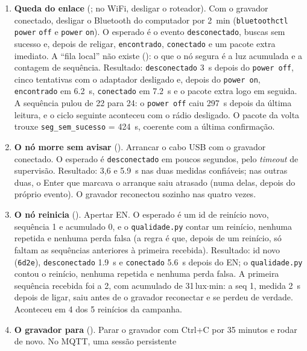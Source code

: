 \begin{enumerate}[label=\alph*)]
  \item \textbf{Queda do enlace} (; no WiFi, desligar o roteador).
    Com o gravador conectado, desligar o Bluetooth do computador por
    \SI{2}{\minute} (\texttt{bluetoothctl} \texttt{power} \texttt{off} e \texttt{power} \texttt{on}).
    O esperado é o evento \texttt{desconectado}, buscas sem sucesso e,
    depois de religar, \texttt{encontrado}, \texttt{conectado} e um pacote
    extra imediato. A \enquote{fila local} não existe (): o que o nó
    segura é a luz acumulada e a contagem de sequência. Resultado:
    \texttt{desconectado} \SI{3}{\second} depois do \texttt{power off},
    cinco tentativas com o adaptador desligado e, depois do
    \texttt{power on}, \texttt{encontrado} em \SI{6.2}{\second},
    \texttt{conectado} em \SI{7.2}{\second} e o pacote extra logo em
    seguida. A sequência pulou de 22 para 24: o \texttt{power off} caiu
    \SI{297}{\second} depois da última leitura, e o ciclo seguinte
    aconteceu com o rádio desligado. O pacote da volta trouxe
    \texttt{seg\_sem\_sucesso} = \SI{424}{\second}, coerente com a última
    confirmação.
  \item \textbf{O nó morre sem avisar} (). Arrancar o cabo USB com o
    gravador conectado. O esperado é \texttt{desconectado} em poucos
    segundos, pelo \emph{timeout} de supervisão. Resultado:
    3,6 e \SI{5.9}{\second} nas duas medidas confiáveis; nas outras duas,
    o Enter que marcava o arranque saiu atrasado (numa delas, depois do
    próprio evento). O gravador reconectou sozinho nas quatro vezes.
  \item \textbf{O nó reinicia} (). Apertar EN. O esperado é um id de
    reinício novo, sequência 1 e acumulado 0, e o \texttt{qualidade.py}
    contar um reinício, nenhuma repetida e nenhuma perda falsa (a regra é
    que, depois de um reinício, só faltam as sequências anteriores à
    primeira recebida). Resultado: id novo (\texttt{6d2e}),
    \texttt{desconectado} \SI{1.9}{\second} e \texttt{conectado}
    \SI{5.6}{\second} depois do EN; o \texttt{qualidade.py} contou o
    reinício, nenhuma repetida e nenhuma perda falsa. A primeira sequência
    recebida foi a 2, com acumulado de 31\,lux$\cdot$min: a seq 1, medida
    \SI{2}{\second} depois de ligar, saiu antes de o gravador reconectar e
    se perdeu de verdade. Aconteceu em 4 dos 5 reinícios da campanha.
  \item \textbf{O gravador para} (). Parar o gravador com Ctrl+C por
    35 minutos e rodar de novo. No MQTT, uma sessão persistente

\end{enumerate}
